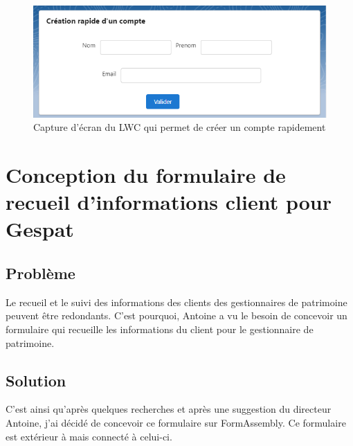 \documentclass[12pt,oneside,noprintercorrection]{iut}
\begin{document}
\begin{figure}[!ht]
  \centering
  \includegraphics[width=15cm]{img/QuickAccountCompo.png}
  \caption{Capture d'écran du LWC qui permet de créer un compte rapidement}
\end{figure}


\section{Conception du formulaire de recueil d'informations client pour Gespat}
 \subsection{Problème}
 Le recueil et le suivi des informations des clients des gestionnaires de patrimoine peuvent être redondants. C'est pourquoi, Antoine a vu le besoin de concevoir un formulaire qui recueille les informations du client pour le gestionnaire de patrimoine.
 \subsection{Solution}
 C'est ainsi qu'après quelques recherches et après une suggestion du directeur Antoine, j'ai décidé de concevoir ce formulaire sur FormAssembly. Ce formulaire est extérieur à \slf{} mais connecté à celui-ci.
 
\end{document}
